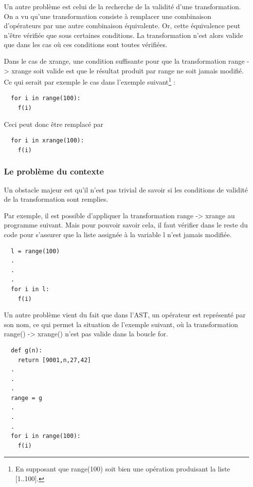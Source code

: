 \documentclass[a4paper]{article}
\begin{document}
Un autre problème est celui de la recherche de la validité d'une transformation. On a vu qu'une transformation consiste à remplacer une combinaison d'opérateurs par une autre combinaison équivalente. Or, cette équivalence peut n'être vérifiée que sous certaines conditions. La transformation n'est alors valide que dans les cas où ces conditions sont toutes vérifiées.

Dans le cas de xrange, une condition suffisante pour que la transformation range -> xrange soit valide est que le résultat produit par range ne soit jamais modifié. Ce qui serait par exemple le cas dans l'exemple suivant\footnote{En supposant que range(100) soit bien une opération produisant la liste [1..100].} :

\begin{verbatim}
  for i in range(100):
    f(i)
\end{verbatim}

Ceci peut donc être remplacé par

\begin{verbatim}
  for i in xrange(100):
    f(i)
\end{verbatim}

\subsubsection{Le problème du contexte}

Un obstacle majeur est qu'il n'est pas trivial de savoir si les conditions de validité de la transformation sont remplies.

Par exemple, il est possible d'appliquer la transformation range -> xrange au programme suivant. Mais pour pouvoir savoir cela, il faut vérifier dans le reste du code pour s'assurer que la liste assignée à la variable l n'est jamais modifiée.

\begin{verbatim}
  l = range(100)
  .
  .
  .
  for i in l:
    f(i)
\end{verbatim}

Un autre problème vient du fait que dans l'AST, un opérateur est représenté par son nom, ce qui permet la situation de l'exemple suivant, où la transformation range() -> xrange() n'est pas valide dans la boucle for.

\begin{verbatim}
  def g(n):
    return [9001,n,27,42]
  .
  .
  .
  range = g
  .
  .
  .
  for i in range(100):
    f(i)
\end{verbatim}
\end{document}
